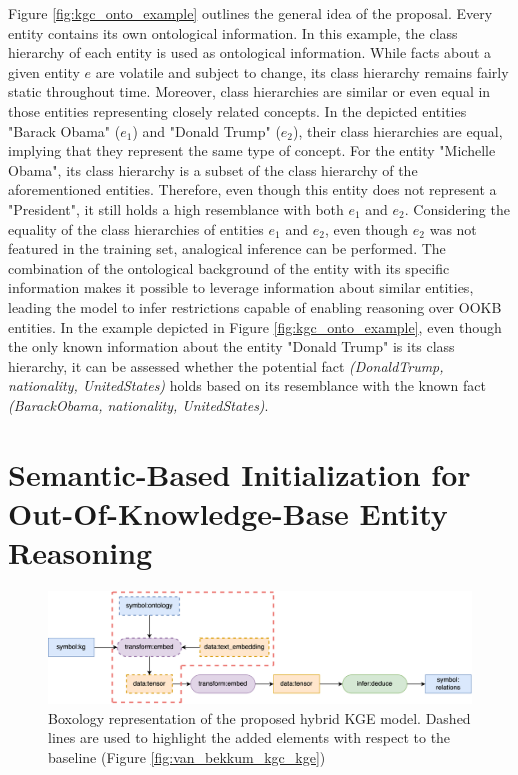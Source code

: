 Figure \ref{fig:kgc_onto_example} outlines the general idea of the proposal. Every entity contains its own ontological information. In this example, the class hierarchy of each entity is used as ontological information. While facts about a given entity $e$ are volatile and subject to change, its class hierarchy remains fairly static throughout time. Moreover, class hierarchies are similar or even equal in those entities representing closely related concepts. In the depicted entities "Barack Obama" ($e_1$) and "Donald Trump" ($e_2$), their class hierarchies are equal, implying that they represent the same type of concept. For the entity "Michelle Obama", its class hierarchy is a subset of the class hierarchy of the aforementioned entities. Therefore, even though this entity does not represent a "President", it still holds a high resemblance with both $e_1$ and $e_2$. Considering the equality of the class hierarchies of entities $e_1$ and $e_2$, even though $e_2$ was not featured in the training set, analogical inference can be performed. The combination of the ontological background of the entity with its specific information makes it possible to leverage information about similar entities, leading the model to infer restrictions capable of enabling reasoning over OOKB entities. In the example depicted in Figure \ref{fig:kgc_onto_example}, even though the only known information about the entity "Donald Trump" is its class hierarchy, it can be assessed whether the potential fact \textit{(DonaldTrump, nationality, UnitedStates)} holds based on its resemblance with the known fact \textit{(BarackObama, nationality, UnitedStates)}. 


\section{Semantic-Based Initialization for Out-Of-Knowledge-Base Entity Reasoning}
\begin{figure}
    \centering
    \includegraphics[width=\linewidth]{4_kbsintegrationdl/figures/VanBekkum_KGEOnto.eps}
    \caption{Boxology representation of the proposed hybrid KGE model. Dashed lines are used to highlight the added elements with respect to the baseline (Figure \ref{fig:van_bekkum_kgc_kge})}
    \label{fig:box_krintodl}
\end{figure} 

